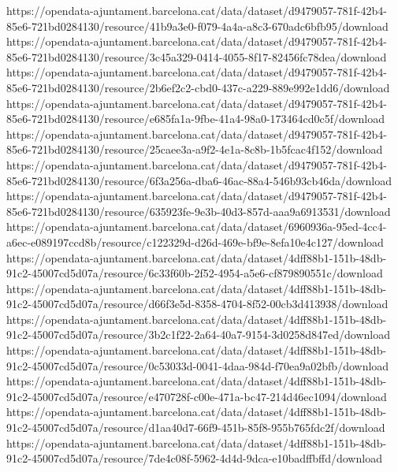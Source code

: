 https://opendata-ajuntament.barcelona.cat/data/dataset/d9479057-781f-42b4-85e6-721bd0284130/resource/41b9a3e0-f079-4a4a-a8c3-670adc6bfb95/download
https://opendata-ajuntament.barcelona.cat/data/dataset/d9479057-781f-42b4-85e6-721bd0284130/resource/3c45a329-0414-4055-8f17-82456fc78dea/download
https://opendata-ajuntament.barcelona.cat/data/dataset/d9479057-781f-42b4-85e6-721bd0284130/resource/2b6ef2c2-cbd0-437c-a229-889e992e1dd6/download
https://opendata-ajuntament.barcelona.cat/data/dataset/d9479057-781f-42b4-85e6-721bd0284130/resource/e685fa1a-9fbe-41a4-98a0-173464cd0c5f/download
https://opendata-ajuntament.barcelona.cat/data/dataset/d9479057-781f-42b4-85e6-721bd0284130/resource/25caee3a-a9f2-4e1a-8c8b-1b5fcac4f152/download
https://opendata-ajuntament.barcelona.cat/data/dataset/d9479057-781f-42b4-85e6-721bd0284130/resource/6f3a256a-dba6-46ac-88a4-546b93cb46da/download
https://opendata-ajuntament.barcelona.cat/data/dataset/d9479057-781f-42b4-85e6-721bd0284130/resource/635923fe-9e3b-40d3-857d-aaa9a6913531/download
https://opendata-ajuntament.barcelona.cat/data/dataset/6960936a-95ed-4cc4-a6ec-e089197ccd8b/resource/c122329d-d26d-469e-bf9e-8efa10e4c127/download
https://opendata-ajuntament.barcelona.cat/data/dataset/4dff88b1-151b-48db-91c2-45007cd5d07a/resource/6c33f60b-2f52-4954-a5e6-cf879890551c/download
https://opendata-ajuntament.barcelona.cat/data/dataset/4dff88b1-151b-48db-91c2-45007cd5d07a/resource/d66f3e5d-8358-4704-8f52-00cb3d413938/download
https://opendata-ajuntament.barcelona.cat/data/dataset/4dff88b1-151b-48db-91c2-45007cd5d07a/resource/3b2c1f22-2a64-40a7-9154-3d0258d847ed/download
https://opendata-ajuntament.barcelona.cat/data/dataset/4dff88b1-151b-48db-91c2-45007cd5d07a/resource/0c53033d-0041-4daa-984d-f70ea9a02bfb/download
https://opendata-ajuntament.barcelona.cat/data/dataset/4dff88b1-151b-48db-91c2-45007cd5d07a/resource/e470728f-c00e-471a-bc47-214d46ec1094/download
https://opendata-ajuntament.barcelona.cat/data/dataset/4dff88b1-151b-48db-91c2-45007cd5d07a/resource/d1aa40d7-66f9-451b-85f8-955b765fdc2f/download
https://opendata-ajuntament.barcelona.cat/data/dataset/4dff88b1-151b-48db-91c2-45007cd5d07a/resource/7de4c08f-5962-4d4d-9dca-e10badffbffd/download